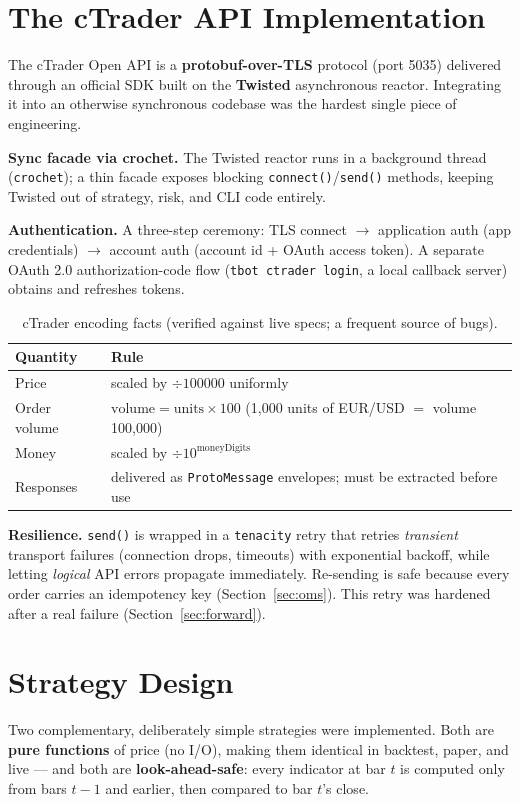\documentclass[11pt,a4paper]{article}
\newcommand{\tbot}[1]{\texttt{#1}}
\begin{document}
\section{The cTrader API Implementation}
The cTrader Open API is a \textbf{protobuf-over-TLS} protocol (port 5035) delivered through an official SDK built on the \textbf{Twisted} asynchronous reactor. Integrating it into an otherwise synchronous codebase was the hardest single piece of engineering.

\noindent\textbf{Sync facade via crochet.} The Twisted reactor runs in a background thread (\tbot{crochet}); a thin facade exposes blocking \tbot{connect()}/\tbot{send()} methods, keeping Twisted out of strategy, risk, and CLI code entirely.

\noindent\textbf{Authentication.} A three-step ceremony: TLS connect $\to$ application auth (app credentials) $\to$ account auth (account id + OAuth access token). A separate OAuth 2.0 authorization-code flow (\tbot{tbot ctrader login}, a local callback server) obtains and refreshes tokens.

\begin{table}[ht]\centering
\caption{cTrader encoding facts (verified against live specs; a frequent source of bugs).}
\begin{tabular}{@{}lp{8.5cm}@{}}
\toprule
\textbf{Quantity} & \textbf{Rule} \\
\midrule
Price & scaled by $\div 100000$ uniformly \\
Order volume & $\text{volume} = \text{units} \times 100$ (1{,}000 units of EUR/USD $=$ volume 100{,}000) \\
Money & scaled by $\div 10^{\text{moneyDigits}}$ \\
Responses & delivered as \tbot{ProtoMessage} envelopes; must be extracted before use \\
\bottomrule
\end{tabular}
\end{table}

\noindent\textbf{Resilience.} \tbot{send()} is wrapped in a \tbot{tenacity} retry that retries \emph{transient} transport failures (connection drops, timeouts) with exponential backoff, while letting \emph{logical} API errors propagate immediately. Re-sending is safe because every order carries an idempotency key (Section~\ref{sec:oms}). This retry was hardened after a real failure (Section~\ref{sec:forward}).

\section{Strategy Design}
Two complementary, deliberately simple strategies were implemented. Both are \textbf{pure functions} of price (no I/O), making them identical in backtest, paper, and live --- and both are \textbf{look-ahead-safe}: every indicator at bar $t$ is computed only from bars $t-1$ and earlier, then compared to bar $t$'s close.
\end{document}
